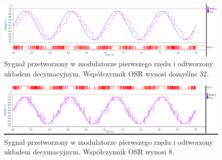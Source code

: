 \documentclass[13pt, a4paper, twoside]{mwart}
\begin{document}
\begin{figure}[H]
	\centering
  \includegraphics[width=0.9\linewidth]{inv/sigma_delta_decymator.png}
  \caption{Sygnał przetworzony w modulatorze pierwszego rzędu i odtworzony układem decymacyjnym. Współczynnik OSR wynosi domyślne 32.}
\end{figure}

\begin{figure}[H]
	\centering
  \includegraphics[width=0.9\linewidth]{inv/sigma_delta_decymator_osr8.png}
  \caption{Sygnał przetworzony w modulatorze pierwszego rzędu i odtworzony układem decymacyjnym. Współczynnik OSR wynosi 8.}
\end{figure}
\end{document}
